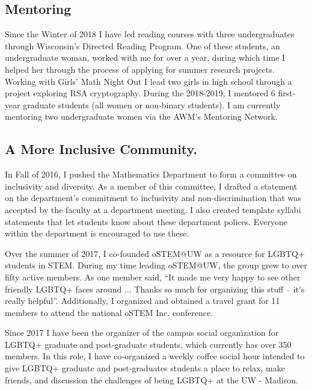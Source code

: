 \documentclass[11pt,reqno]{amsart}
\theoremstyle{remark}
\begin{document}
\subsection{Mentoring}
Since the Winter of 2018 I have led reading courses with three undergraduates through Wisconsin's Directed Reading Program. One of these students, an undergraduate woman, worked with me for over a year, during which time I helped her through the process of applying for summer research projects. Working with Girls' Math Night Out I lead two girls in high school through a project exploring RSA cryptography. During the 2018-2019, I mentored 6 first-year graduate students (all women or non-binary students). I am currently mentoring two undergraduate women via the AWM's Mentoring Network. 


\subsection{A More Inclusive Community.} In Fall of 2016, I pushed the Mathematics Department to form a committee on inclusivity and diversity. As a member of this committee, I drafted a statement on the department's commitment to inclusivity and non-discrimination that was accepted by the faculty at a department meeting. I also created template syllabi statements that let students know about these department polices. Everyone within the department is encouraged to use these. 

Over the summer of 2017, I co-founded oSTEM@UW as a resource for LGBTQ+ students in STEM. During my time leading oSTEM@UW, the group grew to over fifty active members. As one member said, ``It made me very happy to see other friendly LGBTQ+ faces around ... Thanks so much for organizing this stuff -- it's really helpful''. Additionally, I organized and obtained a travel grant for 11 members to attend the national oSTEM Inc. conference. 

Since 2017 I have been the organizer of the campus social organization for LGBTQ+ graduate and post-graduate students, which currently has over 350 members. In this role, I have co-organized a weekly coffee social hour intended to give LGBTQ+ graduate and post-graduates students a place to relax, make friends, and discussion the challenges of being LGBTQ+ at the UW - Madison.

\newpage 


\end{document}
